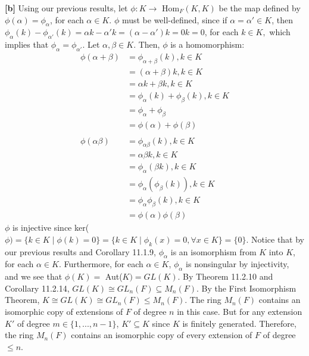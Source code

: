 \textbf{[b]} Using our previous results, let $\phi: K \rightarrow$ Hom$_F(K,K)$ be the map defined by $\phi(\alpha) = \phi_\alpha$, for each $\alpha \in K$. $\phi$ must be well-defined, since if $\alpha = \alpha' \in K$, then $\phi_\alpha(k) - \phi_{\alpha'}(k) = \alpha k - \alpha' k = (\alpha - \alpha')k = 0k = 0$, for each $k \in K,$ which implies that $\phi_\alpha = \phi_{\alpha'}$. Let $\alpha, \beta \in K$. Then, $\phi$ is a homomorphism:
\begin{align*}
    \phi(\alpha + \beta) &= \phi_{\alpha + \beta}(k), k \in K \\
    &= (\alpha + \beta)k, k \in K \\
    &= \alpha k + \beta k, k \in K \\
    &= \phi_\alpha(k) + \phi_\beta(k), k \in K \\
    &= \phi_\alpha + \phi_\beta \\
    &= \phi(\alpha) + \phi(\beta) \\
    \\
    \phi(\alpha\beta) &= \phi_{\alpha\beta}(k), k \in K \\
    &= \alpha\beta k, k \in K \\
    &= \phi_\alpha(\beta k), k \in K \\
    &= \phi_\alpha(\phi_\beta(k)), k \in K \\
    &= \phi_\alpha\phi_\beta(k), k \in K \\
    &= \phi(\alpha)\phi(\beta)
\end{align*}
$\phi$ is injective since ker($\phi) = \{k \in K \mid \phi(k) = 0\} = \{k \in K \mid \phi_k(x) = 0, \forall x \in K\} = \{0\}$. Notice that by our previous results and Corollary 11.1.9, $\phi_\alpha$ is an isomorphism from $K$ into $K$, for each $\alpha \in K$. Furthermore, for each $\alpha \in K$, $\phi_\alpha$ is nonsingular by injectivity, and we see that $\phi(K) =$ Aut($K) = GL(K)$. By Theorem 11.2.10 and Corollary 11.2.14, $GL(K) \cong GL_n(F) \subseteq M_n(F)$. By the First Isomorphism Theorem, $K \cong GL(K) \cong GL_n(F) \le M_n(F)$. The ring $M_n(F)$ contains an isomorphic copy of extensions of $F$ of degree $n$ in this case. But for any extension $K'$ of degree $m \in \{1, ..., n-1\}$, $K' \subseteq K$ since $K$ is finitely generated. Therefore, the ring $M_n(F)$ contains an isomorphic copy of every extension of $F$ of degree $\le n$.